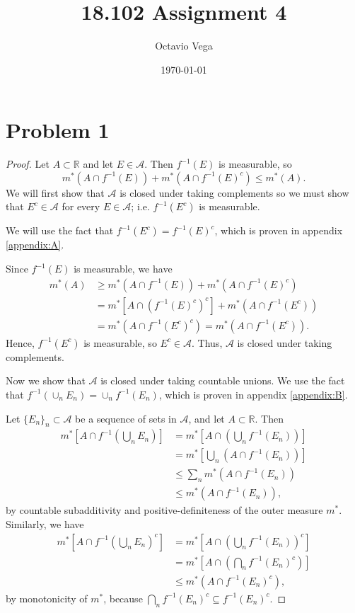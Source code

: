 \documentclass{article}
\title{18.102 Assignment 4}
\author{Octavio Vega}
\date\today
\begin{document}
\maketitle
	
\section*{Problem 1}
\begin{proof}
	Let $A \subset \mathbb{R}$ and let $E \in \mathcal{A}$. Then $f^{-1}(E)$ is measurable, so
	\begin{equation}
		m^*\left(A\cap f^{-1}(E)\right) + m^*\left(A\cap f^{-1}(E)^c\right) \leq m^*(A).
	\end{equation}
	We will first show that $\mathcal{A}$ is closed under taking complements so we must show that $E^c \in \mathcal{A}$ for every $E \in \mathcal{A}$; i.e. $f^{-1}(E^c)$ is measurable. 
	
	We will use the fact that $f^{-1}(E^c) = f^{-1}(E)^c$, which is proven in appendix \ref{appendix:A}.
	
	Since $f^{-1}(E)$ is measurable, we have
	\begin{align}
		m^*(A) &\geq m^*\left(A\cap f^{-1}(E)\right) + m^*\left(A\cap f^{-1}(E)^c\right) \\
		&= m^*\left[A\cap\left(f^{-1}(E)^c\right)^c\right] + m^*\left(A\cap f^{-1}(E^c)\right) \\
		&= m^*\left(A\cap f^{-1}(E^c)^c\right) = m^*\left(A\cap f^{-1}(E^c)\right).
	\end{align}
	Hence, $f^{-1}(E^c)$ is measurable, so $E^c \in \mathcal{A}$. Thus, $\mathcal{A}$ is closed under taking complements.
	
	Now we show that $\mathcal{A}$ is closed under taking countable unions. We use the fact that $f^{-1}\left(\cup_n E_n\right) = \cup_n f^{-1}(E_n)$, which is proven in appendix \ref{appendix:B}.
	
	Let $\{E_n\}_n \subset \mathcal{A}$ be a sequence of sets in $\mathcal{A}$, and let $A\subset \mathbb{R}$. Then 
	\begin{align}
		m^*\left[A\cap f^{-1}\left(\bigcup_n E_n\right)\right] &= m^*\left[A\cap\left(\bigcup_n f^{-1}(E_n)\right)\right] \\
		&= m^*\left[\bigcup_n\left(A\cap f^{-1}(E_n)\right)\right] \\
		& \leq \sum_n m^*\left(A\cap f^{-1}(E_n)\right) \\
		& \leq m^*\left(A\cap f^{-1}(E_n)\right),
	\end{align}
	by countable subadditivity and positive-definiteness of the outer measure $m^*$. Similarly, we have
	\begin{align}
		m^*\left[A\cap f^{-1}\left(\bigcup_n E_n\right)^c\right] &= m^*\left[A\cap \left(\bigcup_n f^{-1}(E_n)\right)^c\right] \\
		&= m^*\left[A\cap\left(\bigcap_n f^{-1}(E_n)^c\right)\right] \\
		&\leq m^*\left(A\cap f^{-1}(E_n)^c\right),
	\end{align}
	by monotonicity of $m^*$, because $\bigcap_n f^{-1}(E_n)^c \subseteq f^{-1}(E_n)^c$.
	

\end{proof}
\end{document}
